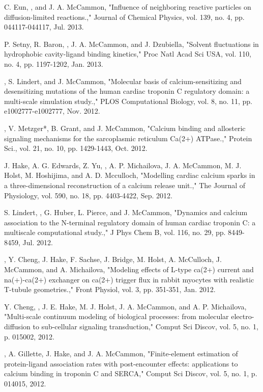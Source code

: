 \documentclass{res} %
\begin{document}
\begin{resume}
\begin{etaremune}
\item C. Eun, \pmkh, and J. A. McCammon, "Influence of neighboring reactive particles on diffusion-limited reactions.," Journal of Chemical Physics, vol. 139, no. 4, pp. 044117-044117, Jul. 2013.
\item P. Setny, R. Baron, \pmkh, J. A. McCammon, and J. Dzubiella, "Solvent fluctuations in hydrophobic cavity-ligand binding kinetics," Proc Natl Acad Sci USA, vol. 110, no. 4, pp. 1197-1202, Jan. 2013.
\item \pmkh, S. Lindert, and J. McCammon, "Molecular basis of calcium-sensitizing and desensitizing mutations of the human cardiac troponin C regulatory domain: a multi-scale simulation study.," PLOS Computational Biology, vol. 8, no. 11, pp. e1002777-e1002777, Nov. 2012.
\item \pmkh*, V. Metzger*, B. Grant, and J. McCammon, "Calcium binding and allosteric signaling mechanisms for the sarcoplasmic reticulum Ca(2+)  ATPase.," Protein Sci., vol. 21, no. 10, pp. 1429-1443, Oct. 2012.
\item J. Hake, A. G. Edwards, Z. Yu, \pmkh, A. P. Michailova, J. A. McCammon, M. J. Holst, M. Hoshijima, and A. D. Mcculloch, "Modelling cardiac calcium sparks in a three-dimensional reconstruction of a calcium release unit.," The Journal of Physiology, vol. 590, no. 18, pp. 4403-4422, Sep. 2012.
\item S. Lindert, \pmkh, G. Huber, L. Pierce, and J. McCammon, "Dynamics and calcium association to the N-terminal regulatory domain of human cardiac troponin C: a multiscale computational study.," J Phys Chem B, vol. 116, no. 29, pp. 8449-8459, Jul. 2012.
\item \pmkh, Y. Cheng, J. Hake, F. Sachse, J. Bridge, M. Holst, A. McCulloch, J. McCammon, and A. Michailova, "Modeling effects of L-type ca(2+) current and na(+)-ca(2+) exchanger on ca(2+) trigger flux in rabbit myocytes with realistic T-tubule geometries.," Front Physiol, vol. 3, pp. 351-351, Jan. 2012.
\item Y. Cheng, \pmkh, J. E. Hake, M. J. Holst, J. A. McCammon, and A. P. Michailova, "Multi-scale continuum modeling of biological processes: from molecular electro-diffusion to sub-cellular signaling transduction," Comput Sci Discov, vol. 5, no. 1, p. 015002, 2012.
\item \pmkh, A. Gillette, J. Hake, and J. A. McCammon, "Finite-element estimation of protein-ligand association rates with post-encounter effects: applications to calcium binding in troponin C and SERCA," Comput Sci Discov, vol. 5, no. 1, p. 014015, 2012.

\end{etaremune}
\end{resume}
\end{document}
